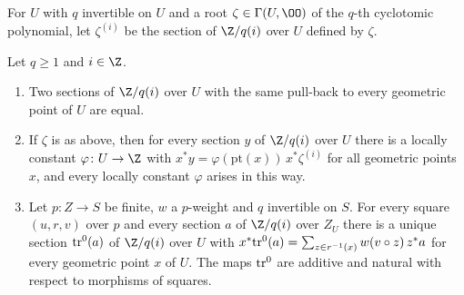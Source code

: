 For $U$ with $q$ invertible on $U$ and a root $\zeta\in\Gamma(U,\OO)$ of the $q$-th cyclotomic
polynomial, let $\zeta^{(i)}$ be the section of $\Z/q(i)$ over $U$ defined by $\zeta$.

\begin{lemma}\label{lem:pf:steps2:trsec}
Let $q\ge1$ and $i\in\Z$.
\begin{enumerate}[label=\textup{(\alph*)},nosep]
\item Two sections of $\Z/q(i)$ over $U$ with the same pull-back to every geometric point of $U$ are
  equal.
\item If $\zeta$ is as above, then for every section $y$ of $\Z/q(i)$ over $U$ there is a locally
  constant $\varphi\colon U\to\Z$ with $x^\ast y=\varphi(\mathrm{pt}(x))\,x^\ast\zeta^{(i)}$ for all
  geometric points $x$, and every locally constant $\varphi$ arises in this way.
\item Let $p\colon Z\to S$ be finite, $w$ a $p$-weight and $q$ invertible on $S$. For every square
  $(u,r,v)$ over $p$ and every section $a$ of $\Z/q(i)$ over $Z_U$ there is a unique section
  $\mathrm{tr}^0(a)$ of $\Z/q(i)$ over $U$ with
  $x^\ast\mathrm{tr}^0(a)=\sum_{z\in r^{-1}(x)}w(v\circ z)\,z^\ast a$ for every geometric point $x$ of
  $U$. The maps $\mathrm{tr}^0$ are additive and natural with respect to morphisms of squares.
\end{enumerate}
\end{lemma}

